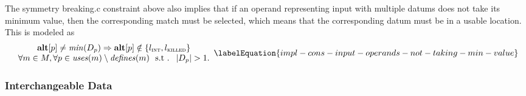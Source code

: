 The \gls{symmetry breaking.c} \gls{constraint} above also implies that if an
\gls{operand} representing input with multiple \glspl{datum} does not take its
minimum value, then the corresponding \gls{match} must be selected, which means
that the corresponding \gls{datum} must be in a usable \gls{location}.
%
This is modeled as
\begin{equation}
  \begin{array}{c}
    \mVar{alt}[p] \neq \mMin(\mDataSet[p])
    \mImp
    \mVar{alt}[p] \notin \mSet{\mIntLocation, \mKilledLocation} \\
    \forall m \in \mMatchSet,
    \forall p \in \mUses(m) \setminus \mDefines(m)
    \text{ \st }
    \mCard{\mDataSet[p]} > 1.
  \end{array}
  \labelEquation{impl-cons-input-operands-not-taking-min-value}
\end{equation}


\subsubsection{Interchangeable Data}

